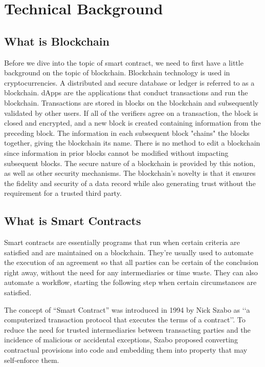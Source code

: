 \documentclass[10pt,twocolumn]{article}
\begin{document}
\section{Technical Background}

\subsection{What is Blockchain}
Before we dive into the topic of smart contract, we need to first have a little background on the topic of blockchain.
Blockchain technology is used in cryptocurrencies. A distributed and secure database or ledger is referred to as a blockchain. dApps are the applications that conduct transactions and run the blockchain. Transactions are stored in blocks on the blockchain and subsequently validated by other users. If all of the verifiers agree on a transaction, the block is closed and encrypted, and a new block is created containing information from the preceding block. The information in each subsequent block "chains" the blocks together, giving the blockchain its name. There is no method to edit a blockchain since information in prior blocks cannot be modified without impacting subsequent blocks. The secure nature of a blockchain is provided by this notion, as well as other security mechanisms. The blockchain's novelty is that it ensures the fidelity and security of a data record while also generating trust without the requirement for a trusted third party.

\subsection{What is Smart Contracts}
Smart contracts are essentially programs that run when certain criteria are satisfied and are maintained on a blockchain. They're usually used to automate the execution of an agreement so that all parties can be certain of the conclusion right away, without the need for any intermediaries or time waste. They can also automate a workflow, starting the following step when certain circumstances are satisfied.

The concept of “Smart Contract” was introduced in 1994 by Nick Szabo as ‘‘a computerized transaction protocol that executes the terms of a contract’’. To reduce the need for trusted intermediaries between transacting parties and the incidence of malicious or accidental exceptions, Szabo proposed converting contractual provisions into code and embedding them into property that may self-enforce them.
\end{document}
